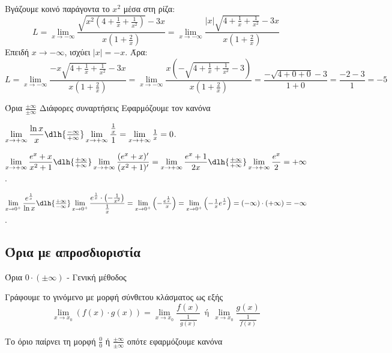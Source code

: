 \lysh
Βγάζουμε κοινό παράγοντα το $x^2$ μέσα στη ρίζα:
\[
L=\lim\limits_{x\to -\infty} \dfrac{\sqrt{x^2(4+\frac{1}{x}+\frac{1}{x^2})} - 3x}{x\left(1+\frac{2}{x}\right)} = \lim\limits_{x\to -\infty} \dfrac{|x|\sqrt{4+\frac{1}{x}+\frac{1}{x^2}} - 3x}{x\left(1+\frac{2}{x}\right)}
\]
Επειδή $x \to -\infty$, ισχύει $|x| = -x$. Άρα:
\[
L= \lim\limits_{x\to -\infty} \dfrac{-x\sqrt{4+\frac{1}{x}+\frac{1}{x^2}} - 3x}{x\left(1+\frac{2}{x}\right)} = \lim\limits_{x\to -\infty} \frac{x\left( -\sqrt{4+\frac{1}{x}+\frac{1}{x^2}} - 3 \right)}{x\left(1+\frac{2}{x}\right)}
= \dfrac{-\sqrt{4+0+0} - 3}{1+0} = \dfrac{-2-3}{1} = -5
\]
\begin{askhsh}{Όρια $ \frac{\pm\infty}{\pm\infty} $ Διάφορες συναρτήσεις}
Εφαρμόζουμε τον κανόνα 
\end{askhsh}
\lysh\vspace{-7mm}
\begin{alist}
\item $\lim\limits_{x\to +\infty}{\dfrac{\ln{x}}{x}}\dlh{\frac{-\infty}{+\infty}}\lim\limits_{x\to +\infty}{\dfrac{\frac{1}{x}}{1}}=\lim\limits_{x\to+\infty}{\frac{1}{x}}=0$.
\item $\lim\limits_{x\to +\infty} \dfrac{e^x + x}{x^2 + 1}\dlh{\frac{+\infty}{+\infty}}\lim\limits_{x\to +\infty} \dfrac{(e^x + x)'}{(x^2 + 1)'} = \lim\limits_{x\to +\infty} \dfrac{e^x + 1}{2x}\dlh{\frac{+\infty}{+\infty}} \lim\limits_{x\to +\infty} \dfrac{e^x}{2} = +\infty$.
\item $\lim\limits_{x\to 0^+}{\dfrac{e^{\frac{1}{x}}}{\ln{x}}}\dlh{\frac{+\infty}{-\infty}}\lim\limits_{x\to 0^+}{\dfrac{e^{\frac{1}{x}}\cdot\left(-\frac{1}{x^2}\right)}{\frac{1}{x}}}=\lim\limits_{x\to 0^+}{\left(-\frac{e^{\frac{1}{x}}}{x}\right)}=\lim\limits_{x\to0^+}{\left(-\frac{1}{x}e^{\frac{1}{x}}\right)}=(-\infty)\cdot(+\infty)=-\infty$.
\end{alist}
\subsection{Όρια με απροσδιοριστία \bmath{$ 0\cdot(\pm\infty) $}}
\begin{askhsh}{Όρια $ 0\cdot(\pm\infty) $ - Γενική μέθοδος}
\bhmata\begin{bhma}
\item Γράφουμε το γινόμενο με μορφή σύνθετου κλάσματος ως εξής
\[ \lim\limits_{x\to x_0}{\left(f(x)\cdot g(x)\right)}=\lim\limits_{x\to x_0}{\dfrac{f(x)}{\frac{1}{g(x)}}}\ \ \textrm{ή}\ \ \lim\limits_{x\to x_0}{\dfrac{g(x)}{\frac{1}{f(x)}}} \]
\item Το όριο παίρνει τη μορφή $ \frac{0}{0} $ ή $ \frac{\pm\infty}{\pm\infty} $ οπότε εφαρμόζουμε κανόνα 
\end{bhma}
\end{askhsh}

